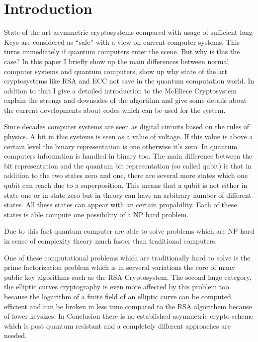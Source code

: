 \label{key}\section{Introduction}
State of the art asymmetric cryptosystems compared with usage of sufficient long Keys are considered as "`safe"' with a view on current computer systems. This turns immediately if quantum computers enter the scene. But why is this the case? In this paper I briefly show up the main differences between normal computer systems and quantum computers, show up why state of the art cryptosystems like RSA and ECC not save in the quantum computation world. In addtion to that I give a detailed introduction to the McEliece Cryptosystem explain the strengs and downsides of the algortihm and give some details about the current developments about codes which can be used for the system.

\label{conv_comp_vs_quan_comp}
Since decades computer systems are seen as digital circuits based on the rules of physics. A bit in this systems is seen as a value of voltage. If this value is above a certain level the binary representation is one otherwise it's zero. 
In quantum computers information is handled in binary too. The main difference between the bit representation and the quantum bit representation (so called qubit) is that in addition to the two states zero and one, there are several more states which one qubit can reach due to a superposition. This means that a qubit is not either in state one or in state zero but in theory can have an arbitrary number of different states. All these states can appear with an certain propability. Each of these states is able compute one possibility of a NP hard problem. 

Due to this fact quantum computer are able to solve problems which are NP hard in sense of complexity theory much faster than traditional computers. 

One of these computational problems which are traditionally hard to solve is the prime factorization problem which is in serveral variations the core of many public key algorithms such as the RSA Cryptosystem. 
The second huge category, the elliptic curves cryptography is even more affected by this problem too because the logarithm of a finite field of an elliptic curve can be computed efficient and can be broken in less time compared to the RSA algorithem  because of lower keysizes. 
In Conclusion there is no established asymmetric crypto scheme which is post quantum resistant and a completely different approaches are needed. 

